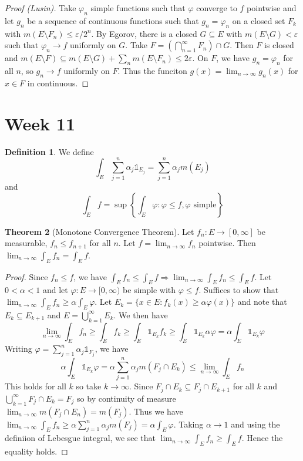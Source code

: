 \documentclass{article}
\renewcommand{\implies}{\Rightarrow}
\theoremstyle{definition} %
\newtheorem{thm}{Theorem}
\numberwithin{thm}{section} %
\theoremstyle{definition} %
\newtheorem{defn}[thm]{Definition}
\begin{document}
\begin{proof}[Proof (Lusin)]
Take $\varphi_n$ simple functions such that $\varphi$ converge to $f$ pointwise and let $g_n$ be a sequence of continuous functions such that $g_n = \varphi_n$ on a closed set $F_k$ with $m(E \setminus F_n) \leq \varepsilon / 2^n$. By Egorov, there is a closed $G \subseteq E$ with $m(E \setminus G) < \varepsilon$ such that $\varphi_n \to f$ uniformly on $G$. Take $F = \left(\bigcap_{n = 1}^\infty F_n\right) \cap G$. Then $F$ is closed and $m(E \setminus F) \subseteq m(E \setminus G) + \sum_n m(E \setminus F_n) \leq 2\varepsilon$. On $F$, we have $g_n = \varphi_n$ for all $n$, so $g_n \to f$ uniformly on $F$. Thus the funciton $g(x) = \lim_{n \to \infty} g_n(x)$ for $x \in F$ in continuous.
\end{proof}

\section{Week 11}

\begin{defn}
We define \[ \int_E \sum_{j = 1}^n \alpha_j \mathds{1}_{E_j} = \sum_{j = 1}^n \alpha_j m(E_j) \]
and 
\[ \int_E f = \sup\left\{\int_E \varphi: \varphi \leq f, \varphi \text{ simple} \right\} \]
\end{defn}

\begin{thm}[Monotone Convergence Theorem]
Let $f_n: E \to [0, \infty]$ be measurable, $f_n \leq f_{n + 1}$ for all $n$. Let $f = \lim_{n \to \infty} f_n$ pointwise. Then $\lim_{n\to \infty} \int_E f_n = \int_E f$.
\end{thm}
\begin{proof}
Since $f_n \leq f$, we have $\int_E f_n \leq \int_E f \implies \lim_{n\to\infty}\int_E f_n \leq \int_E f$. Let $0 < \alpha < 1$ and let $\varphi: E \to [0, \infty)$ be simple with $\varphi \leq f$. Suffices to show that $\lim_{n \to \infty} \int_E f_n \geq \alpha\int_E \varphi$. Let $E_k = \{x \in E: f_k(x) \geq \alpha \varphi(x)\}$ and note that $E_k \subseteq E_{k + 1}$ and $E = \bigcup_{k = 1}^\infty E_k$. We then have
\[ \lim_{n \to \infty} \int_E f_n \geq \int_E f_k \geq \int_E \mathds{1}_{E_k} f_k \geq \int_E \mathds{1}_{E_k} \alpha \varphi = \alpha\int_E \mathds{1}_{E_k} \varphi \]
Writing $\varphi = \sum_{j = 1}^n \alpha_j\mathds{1}_{F_j}$, we have
\[ \alpha\int_E \mathds{1}_{E_k} \varphi = \alpha\sum_{j = 1}^n \alpha_j m(F_j \cap E_k) \leq \lim_{n \to \infty} \int_E f_n \]
This holds for all $k$ so take $k \to \infty$. Since $F_j \cap E_k \subseteq F_j \cap E_{k + 1}$ for all $k$ and $\bigcup_{k = 1}^\infty F_j \cap E_k = F_j$ so by continuity of measure $\lim_{n \to \infty} m(F_j \cap E_n) = m(F_j)$. Thus we have $\lim_{n \to \infty} \int_E f_n \geq \alpha \sum_{j = 1}^n \alpha_j m(F_j) = \alpha \int_E \varphi$. Taking $\alpha \to 1$ and using the definiion of Lebesgue integral, we see that $\lim_{n \to \infty} \int_E f_n \geq \int_E f$. Hence the equality holds.
\end{proof}
\end{document}
